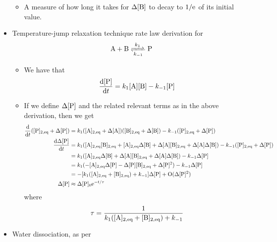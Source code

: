 \documentclass[../notes.tex]{subfiles}
\begin{document}
\begin{itemize}
    \begin{itemize}
        \item A measure of how long it takes for $\Delta[\ce{B}]$ to decay to $1/\text{e}^{}$ of its initial value.
    \end{itemize}
    \item Temperature-jump relaxation technique rate law derivation for
    \begin{equation*}
        \ce{A + B <=>[$k_1$][$k_{-1}$] P}
    \end{equation*}
    \begin{itemize}
        \item We have that
        \begin{equation*}
            \dv{[\ce{P}]}{t} = k_1[\ce{A}][\ce{B}]-k_{-1}[\ce{P}]
        \end{equation*}
        \item If we define $\Delta[\ce{P}]$ and the related relevant terms as in the above derivation, then we get
        \begin{align*}
            \dv{t}([\ce{P}]_{2,\text{eq}}+\Delta[\ce{P}]) &= k_1([\ce{A}]_{2,\text{eq}}+\Delta[\ce{A}])([\ce{B}]_{2,\text{eq}}+\Delta[\ce{B}])-k_{-1}([\ce{P}]_{2,\text{eq}}+\Delta[\ce{P}])\\
            \dv{\Delta[\ce{P}]}{t} &= k_1([\ce{A}]_{2,\text{eq}}[\ce{B}]_{2,\text{eq}}+[\ce{A}]_{2,\text{eq}}\Delta[\ce{B}]+\Delta[\ce{A}][\ce{B}]_{2,\text{eq}}+\Delta[\ce{A}]\Delta[\ce{B}])-k_{-1}([\ce{P}]_{2,\text{eq}}+\Delta[\ce{P}])\\
            &= k_1([\ce{A}]_{2,\text{eq}}\Delta[\ce{B}]+\Delta[\ce{A}][\ce{B}]_{2,\text{eq}}+\Delta[\ce{A}]\Delta[\ce{B}])-k_{-1}\Delta[\ce{P}]\\
            &= k_1(-[\ce{A}]_{2,\text{eq}}\Delta[\ce{P}]-\Delta[\ce{P}][\ce{B}]_{2,\text{eq}}+\Delta[\ce{P}]^2)-k_{-1}\Delta[\ce{P}]\\
            &= -[k_1([\ce{A}]_{2,\text{eq}}+[\ce{B}]_{2,\text{eq}})+k_{-1}]\Delta[\ce{P}]+\text{O}(\Delta[\ce{P}]^2)\\
            \Delta[\ce{P}] &\approx \Delta[\ce{P}]_0\e[-t/\tau]
        \end{align*}
        where
        \begin{equation*}
            \tau = \frac{1}{k_1([\ce{A}]_{2,\text{eq}}+[\ce{B}]_{2,\text{eq}})+k_{-1}}
        \end{equation*}
    \end{itemize}
    \item Water dissociation, as per

\end{itemize}
\end{document}
